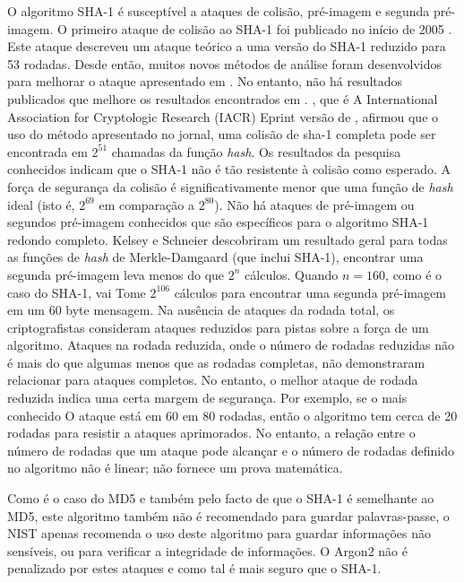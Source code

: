 \documentclass[conference]{IEEEtran}
\begin{document}
O algoritmo SHA-1 é susceptível a ataques de colisão, pré-imagem e segunda pré-imagem. 
O primeiro ataque de colisão ao SHA-1 foi publicado no início de 2005 \cite{10100797835403057436}.
Este ataque descreveu um ataque teórico a uma versão do SHA-1
reduzido para 53 rodadas. Desde então, muitos novos métodos de análise foram desenvolvidos 
para melhorar o ataque apresentado em \cite{101007115352182}. No entanto, não há resultados publicados que
melhore os resultados encontrados em \cite{101007115352182}. \cite{manuel2011}, que é
A International Association for Cryptologic Research (IACR) Eprint
versão de \cite{manuel2011}, afirmou que o uso do método apresentado no
jornal, uma colisão de sha-1 completa pode ser encontrada em $2^{51}$ 
chamadas da função \textit{hash}. Os resultados da pesquisa conhecidos indicam que o SHA-1 não é tão
resistente à colisão como esperado. A força de segurança da colisão é
significativamente menor que uma função de \textit{hash} ideal (isto é, $2^{69}$ em comparação
a $2^{80}$). Não há ataques de pré-imagem ou segundos pré-imagem conhecidos que são
específicos para o algoritmo SHA-1 redondo completo. Kelsey e Schneier \cite{kelsey2005} descobriram um
resultado geral para todas as funções de \textit{hash} de Merkle-Damgaard
(que inclui SHA-1), encontrar uma segunda pré-imagem leva menos do que
$2^{n}$ cálculos. Quando $n = 160$, como é o caso do SHA-1, vai
Tome $2^{106}$ cálculos para encontrar uma segunda pré-imagem em um 60 byte
mensagem. Na ausência de ataques da rodada total, os criptografistas consideram
ataques reduzidos para pistas sobre a força de um algoritmo.
Ataques na rodada reduzida, onde o número de rodadas reduzidas não é mais
do que algumas menos que as rodadas completas, não demonstraram relacionar
para ataques completos. No entanto, o melhor ataque de rodada reduzida
indica uma certa margem de segurança. Por exemplo, se o mais conhecido
O ataque está em 60 em 80 rodadas, então o algoritmo tem cerca de 20
rodadas para resistir a ataques aprimorados. No entanto, a relação entre
o número de rodadas que um ataque pode alcançar e o número de rodadas
definido no algoritmo não é linear; não fornece um
prova matemática. \cite{rfc6194}

Como é o caso do MD5 e também pelo facto de que o SHA-1 é semelhante ao MD5, este algoritmo 
também não é recomendado para guardar palavras-passe, o NIST apenas recomenda o uso deste algoritmo 
para guardar informações não sensíveis, ou para verificar a integridade de informações. 
O Argon2 não é penalizado por estes ataques e como tal é mais seguro que o SHA-1.
\end{document}
